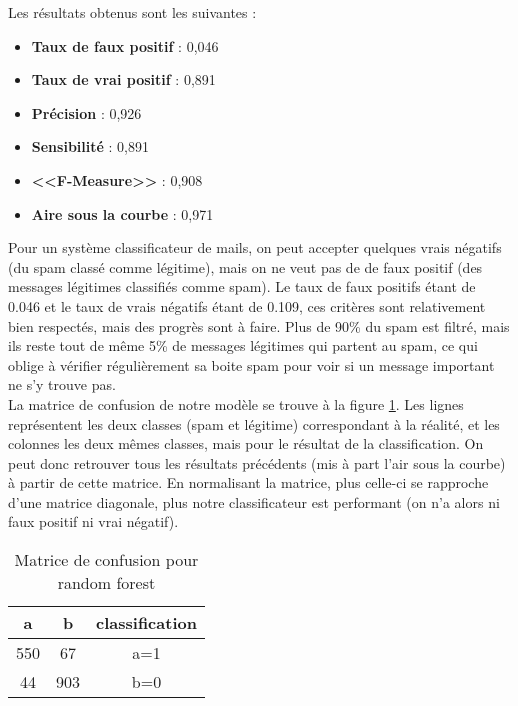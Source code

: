 \begin{homeworkProblem}
\begin{homeworkSection}{2.2}
{			Les résultats obtenus sont les suivantes :
			
			\begin{itemize}
			\item \textbf{Taux de faux positif} : 0,046
			\item \textbf{Taux de vrai positif} : 0,891
			\item \textbf{Précision} : 0,926
			\item \textbf{Sensibilité} : 0,891
			\item \textbf{<<F-Measure>>} : 0,908
			\item \textbf{Aire sous la courbe} : 0,971
			\end{itemize}
			
			Pour un système classificateur de mails, on peut accepter quelques vrais négatifs (du spam classé comme légitime), mais on ne veut pas de de faux positif (des messages légitimes classifiés comme spam). Le taux de faux positifs étant de 0.046 et le taux de vrais négatifs étant de 0.109, ces critères sont relativement bien respectés, mais des progrès sont à faire. Plus de 90\% du spam est filtré, mais ils reste tout de même 5\% de messages légitimes qui partent au spam, ce qui oblige à vérifier régulièrement sa boite spam pour voir si un message important ne s'y trouve pas.\\
			
			La matrice de confusion de notre modèle se trouve à la figure \ref{tab:confMat22}.
			Les lignes représentent les deux classes (spam et légitime) correspondant à la réalité, et les colonnes les deux mêmes classes, mais pour le résultat de la classification. On peut donc retrouver tous les résultats précédents (mis à part l'air sous la courbe) à partir de cette matrice. En normalisant la matrice, plus celle-ci se rapproche d'une matrice diagonale, plus notre classificateur est performant (on n'a alors ni faux positif ni vrai négatif).
			
			}
			
			
			\begin{table}
			\centering
			\begin{tabular}{|c|c||c|}
			
			\hline 
			a & b & classification \\ 
			\hline 
			550 & 67 & a=1 \\ 
			\hline 
			44 & 903 & b=0 \\ 
			\hline 
			\end{tabular} 
			\caption{Matrice de confusion pour random forest}
			\label{tab:confMat22}			
			\end{table}			
			

\end{homeworkSection}
\end{homeworkProblem}
